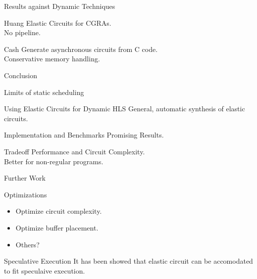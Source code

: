 \documentclass[page number]{beamer}
\begin{document}
\begin{frame}{Results against Dynamic Techniques}
  \begin{block}{Huang}
    Elastic Circuits for CGRAs.\\
    No pipeline.
  \end{block}
  \vfill
  \begin{block}{Cash}
    Generate asynchronous circuits from C code.\\
    Conservative memory handling.
  \end{block}
  \vfill
  \tiny
  \hspace*{-8pt}
\end{frame}

\begin{frame}{Conclusion}
  \begin{alertblock}{Limits of static scheduling}
  \end{alertblock}
  \vfill
  \begin{exampleblock}{Using Elastic Circuits for Dynamic HLS}
    General, automatic synthesis of elastic circuits.
  \end{exampleblock}
  \vfill
  \begin{exampleblock}{Implementation and Benchmarks}
    Promising Results.
  \end{exampleblock}
  \vfill
  \begin{block}{Tradeoff}
    Performance and Circuit Complexity.\\
    Better for non-regular programs.
  \end{block}
\end{frame}

\begin{frame}{Further Work}
  \begin{block}{Optimizations}
    \begin{itemize}
    \item Optimize circuit complexity.
    \item Optimize buffer placement.
    \item Others?
    \end{itemize}
  \end{block}
  \vfill
  \begin{block}{Speculative Execution}
    It has been showed that elastic circuit can be accomodated to fit speculaive execution.
  \end{block}
\end{frame}
\end{document}
